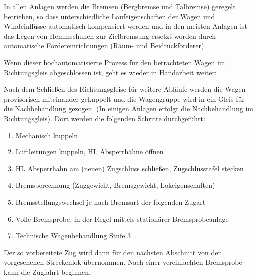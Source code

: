 In allen Anlagen werden die Bremsen (Bergbremse und Talbremse) geregelt betrieben, so dass unterschiedliche Laufeigenschaften der Wagen und Windeinflüsse automatisch kompensiert werden und in den meisten Anlagen ist das Legen von Hemmschuhen zur Zielbremsung ersetzt worden durch automatische Fördereinrichtungen (Räum- und Beidrückförderer).

Wenn dieser hochautomatisierte Prozess für den betrachteten Wagen im Richtungsgleis abgeschlossen ist, geht es wieder in Handarbeit weiter:

Nach dem Schließen des Richtungsgleise für weitere Abläufe werden die Wagen provisorisch miteinander gekuppelt und die Wagengruppe wird in ein Gleis für die Nachbehandlung gezogen. (In einigen Anlagen erfolgt die Nachbehandlung im Richtungsgleis). Dort werden die folgenden Schritte durchgeführt:

\begin{enumerate}
    \item Mechanisch kuppeln
    \item Luftleitungen kuppeln, HL Absperrhähne öffnen
    \item HL Absperrhahn am (neuen) Zugschluss schließen, Zugschlusstafel stecken
    \item Bremsberechnung (Zuggewicht, Bremsgewicht, Lokeigenschaften)
    \item Bremsstellungswechsel je nach Bremsart der folgenden Zugart
    \item Volle Bremsprobe, in der Regel mittels stationärer Bremsprobeanlage
    \item Technische Wagenbehandlung Stufe 3
\end{enumerate}

Der so vorbereitete Zug wird dann für den nächsten Abschnitt von der vorgesehenen Streckenlok übernommen. Nach einer vereinfachten Bremsprobe kann die Zugfahrt beginnen.











